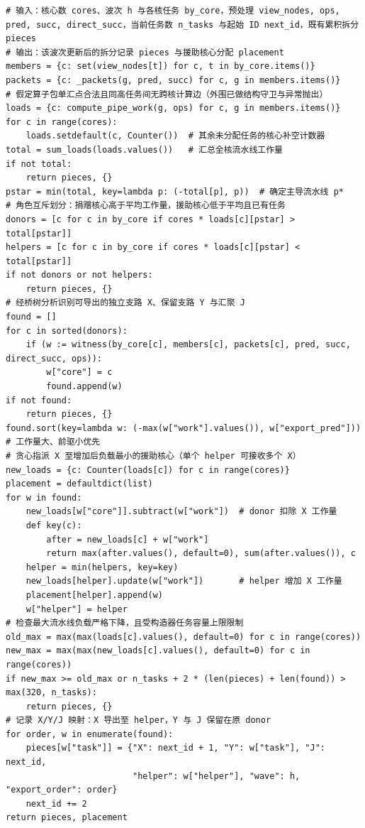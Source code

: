 \documentclass[anonymous,notoc]{gmcm2026}
\begin{document}
\FloatBarrier
\begin{algorithm}[!htbp]
\caption{分支援助重分配的波次分支选择与分配算法}\label{alg:p1-branch-aid}
\small


\begin{lstlisting}[style=paperpseudolong]
# 输入：核心数 cores、波次 h 与各核任务 by_core，预处理 view_nodes, ops, pred, succ, direct_succ，当前任务数 n_tasks 与起始 ID next_id，既有累积拆分 pieces
# 输出：该波次更新后的拆分记录 pieces 与援助核心分配 placement
members = {c: set(view_nodes[t]) for c, t in by_core.items()}
packets = {c: _packets(g, pred, succ) for c, g in members.items()}
# 假定算子包单汇点合法且同高任务间无跨核计算边（外围已做结构守卫与异常抛出）
loads = {c: compute_pipe_work(g, ops) for c, g in members.items()}
for c in range(cores):
    loads.setdefault(c, Counter())  # 其余未分配任务的核心补空计数器
total = sum_loads(loads.values())   # 汇总全核流水线工作量
if not total:
    return pieces, {}
pstar = min(total, key=lambda p: (-total[p], p))  # 确定主导流水线 p*
# 角色互斥划分：捐赠核心高于平均工作量，援助核心低于平均且已有任务
donors = [c for c in by_core if cores * loads[c][pstar] > total[pstar]]
helpers = [c for c in by_core if cores * loads[c][pstar] < total[pstar]]
if not donors or not helpers:
    return pieces, {}
# 经桥树分析识别可导出的独立支路 X、保留支路 Y 与汇聚 J
found = []
for c in sorted(donors):
    if (w := witness(by_core[c], members[c], packets[c], pred, succ, direct_succ, ops)):
        w["core"] = c
        found.append(w)
if not found:
    return pieces, {}
found.sort(key=lambda w: (-max(w["work"].values()), w["export_pred"]))  # 工作量大、前驱小优先
# 贪心指派 X 至增加后负载最小的援助核心（单个 helper 可接收多个 X）
new_loads = {c: Counter(loads[c]) for c in range(cores)}
placement = defaultdict(list)
for w in found:
    new_loads[w["core"]].subtract(w["work"])  # donor 扣除 X 工作量
    def key(c):
        after = new_loads[c] + w["work"]
        return max(after.values(), default=0), sum(after.values()), c
    helper = min(helpers, key=key)
    new_loads[helper].update(w["work"])       # helper 增加 X 工作量
    placement[helper].append(w)
    w["helper"] = helper
# 检查最大流水线负载严格下降，且受构造器任务容量上限限制
old_max = max(max(loads[c].values(), default=0) for c in range(cores))
new_max = max(max(new_loads[c].values(), default=0) for c in range(cores))
if new_max >= old_max or n_tasks + 2 * (len(pieces) + len(found)) > max(320, n_tasks):
    return pieces, {}
# 记录 X/Y/J 映射：X 导出至 helper，Y 与 J 保留在原 donor
for order, w in enumerate(found):
    pieces[w["task"]] = {"X": next_id + 1, "Y": w["task"], "J": next_id,
                         "helper": w["helper"], "wave": h, "export_order": order}
    next_id += 2
return pieces, placement
\end{lstlisting}

\end{algorithm}
\FloatBarrier
\end{document}
